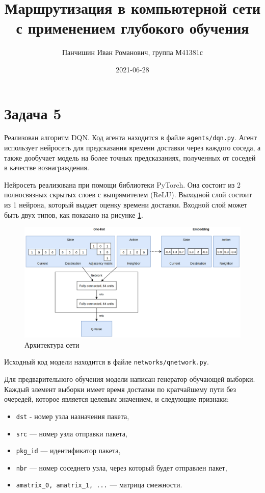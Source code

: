 \documentclass[a4paper]{article}
\title{Маршрутизация в компьютерной сети с применением глубокого обучения}
\author{Панчишин Иван Романович, группа М41381с}
\date{2021-06-28}
\begin{document}
\maketitle

\section{Задача 5}

Реализован алгоритм DQN. Код агента находится в файле \texttt{agents/dqn.py}.
Агент использует нейросеть для предсказания времени доставки через
каждого соседа, а также дообучает модель на более точных предсказаниях,
полученных от соседей в качестве вознаграждения. 

Нейросеть реализована при помощи библиотеки PyTorch. Она состоит из 2
полносвязных скрытых слоев с выпрямителем (ReLU). Выходной слой состоит из 1
нейрона, который выдает оценку времени доставки. Входной слой может быть двух
типов, как показано на рисунке \ref{fig:arch}.

\begin{figure}[H]
    \centering
    \includegraphics[width=\textwidth]{figs/nn-arch}
    \caption{Архитектура сети}\label{fig:arch}
\end{figure}

Исходный код модели находится в файле \texttt{networks/qnetwork.py}.

Для предварительного обучения модели написан генератор обучающей выборки.
Каждый элемент выборки имеет время доставки по кратчайшему пути без очередей,
которое является целевым значением, и следующие признаки:
\begin{itemize}
    \item \texttt{dst} - номер узла назначения пакета,

    \item \texttt{src} --- номер узла отправки пакета,

    \item \texttt{pkg\_id} --- идентификатор пакета,

    \item \texttt{nbr} --- номер соседнего узла, через который будет отправлен
        пакет,

    \item \texttt{amatrix\_0, amatrix\_1, ...} --- матрица смежности.
\end{itemize}
\end{document}
